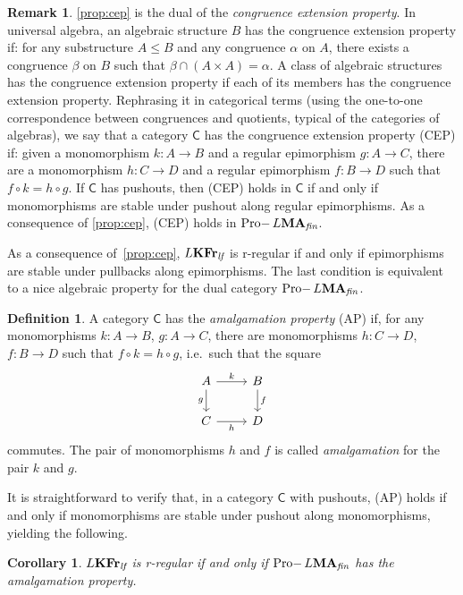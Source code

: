 \documentclass{article}
\newtheorem{cor}{Corollary}
\theoremstyle{definition}
\newtheorem{defn}{Definition}
\newtheorem{rem}{Remark}
\DeclareMathOperator{\Pro}{Pro-}
\newcommand{\KFr}{\textup{\textbf{KFr}}}
\newcommand{\MA}{\textup{\textbf{MA}}}
\newcommand{\fin}{\textit{fin}}
\newcommand{\lf}{\textit{lf}}
\begin{document}
\begin{rem}
\cref{prop:cep} is the dual of the \emph{congruence extension property}. In universal algebra, an algebraic structure $B$ has the congruence extension property if: for any substructure $A \leq B$ and any congruence $\alpha$ on $A$, there exists a congruence $\beta$ on $B$ such that $\beta \cap (A \times A) = \alpha$. A class of algebraic structures has the congruence extension property if each of its members has the congruence extension property. Rephrasing it in categorical terms (using the one-to-one correspondence between congruences and quotients, typical of the categories of algebras), we say that a category $\mathsf{C}$ has the congruence extension property (CEP) if: given a monomorphism $k \colon A \longrightarrow B$ and a regular epimorphism $g \colon A \longrightarrow C$, there are a monomorphism $h \colon C \longrightarrow D$ and a regular epimorphism $f \colon B \longrightarrow D$ such that $f \circ k = h \circ g$. If $\mathsf{C}$ has pushouts, then (CEP) holds in $\mathsf{C}$ if and only if monomorphisms are stable under pushout along regular epimorphisms. As a consequence of \cref{prop:cep}, (CEP) holds in  $\Pro L\MA_\fin$.
\end{rem}


As a consequence of~\cref{prop:cep}, $L\KFr_\lf$ is r-regular if and only if epimorphisms are stable under pullbacks along epimorphisms. The last condition is equivalent to a nice algebraic property for the dual category $\Pro L\MA_\fin$.
\begin{defn}
A category $\mathsf{C}$ has the \emph{amalgamation property} (AP) if, for any monomorphisms $k \colon A \longrightarrow B$, $g \colon A \longrightarrow C$, there are monomorphisms $h \colon C \longrightarrow D$, $f \colon B \longrightarrow D$ such that $f \circ k = h \circ g$, i.e.\ such that the square
\[\begin{tikzcd}
	A & B \\
	C & D
	\arrow["k", from=1-1, to=1-2]
	\arrow["g"', from=1-1, to=2-1]
	\arrow["f", from=1-2, to=2-2]
	\arrow["h"', from=2-1, to=2-2]
\end{tikzcd}\]
commutes. The pair of monomorphisms $h$ and $f$ is called \emph{amalgamation} for the pair $k$ and $g$.
\end{defn}

It is straightforward to verify that, in a category $\mathsf{C}$ with pushouts, (AP) holds if and only if monomorphisms are stable under pushout along monomorphisms, yielding the following.
\begin{cor}\label{cor:regap}
$L\KFr_\lf$ is r-regular if and only if $\Pro L\MA_\fin$ has the amalgamation property.
\end{cor}
\end{document}
